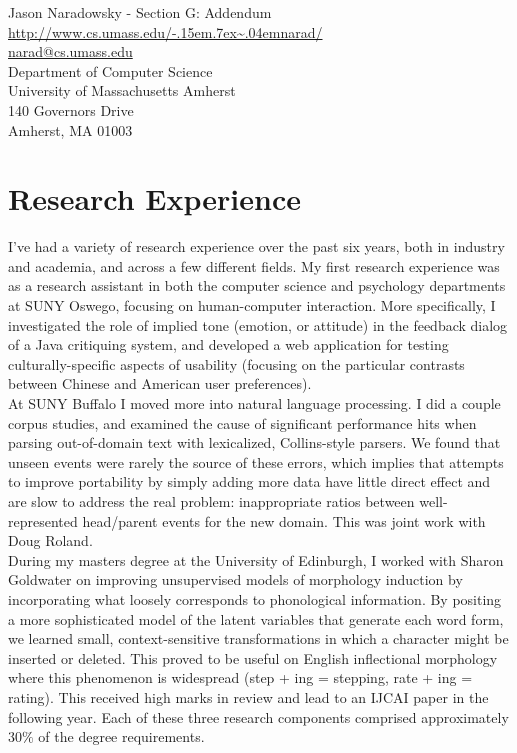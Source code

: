 \documentclass[11pt, a4paper]{article}
\def\urltilda{\kern -.15em\lower .7ex\hbox{\~{}}\kern .04em}
\begin{document}
\reversemarginpar
\textsf{\Huge Jason Naradowsky - Section G: Addendum}\\
\href{http://www.cs.umass.edu/~narad/}{http://www.cs.umass.edu/\urltilda{}narad/}\\ 
 \href{mailto:narad@cs.umass.edu}{narad@cs.umass.edu}\\[.2 cm]

Department of Computer Science\\
University of Massachusetts Amherst\\
140 Governors Drive\\
Amherst, MA 01003

\section*{Research Experience}

I've had a variety of research experience over the past six years, both in
industry and academia, and across a few different fields.  My first research experience
was as a research assistant in both the computer science and psychology
departments at SUNY Oswego, focusing on human-computer interaction.
More specifically, I investigated the role of implied tone (emotion, or attitude)
in the feedback dialog of a Java critiquing system, and developed a web
application for testing culturally-specific aspects of usability (focusing on
the particular contrasts between Chinese and American user preferences).\\

At SUNY Buffalo I moved more into natural language processing.  I did
a couple corpus studies, and examined the cause of significant performance
hits when parsing out-of-domain text with lexicalized, Collins-style parsers.
We found that unseen events were rarely the source of these errors, which
implies that attempts to improve portability by simply adding more data 
have little direct effect and are slow to address the real problem: inappropriate
ratios between well-represented head/parent events for the new domain.  This
was joint work with Doug Roland.\\

During my masters degree at the University of Edinburgh, I worked with
Sharon Goldwater on improving unsupervised models of morphology
induction by incorporating what loosely corresponds to phonological
information.  By positing a more sophisticated model of the latent
variables that generate each word form, we learned small, context-sensitive
transformations in which a character might be inserted or deleted.  This
proved to be useful on English inflectional morphology where this
phenomenon is widespread (step + ing = stepping, rate + ing = rating).
This received high marks in review and lead to an IJCAI paper in
the following year.  Each of these three research components comprised approximately
30$\%$ of the degree requirements.\\
\end{document}
